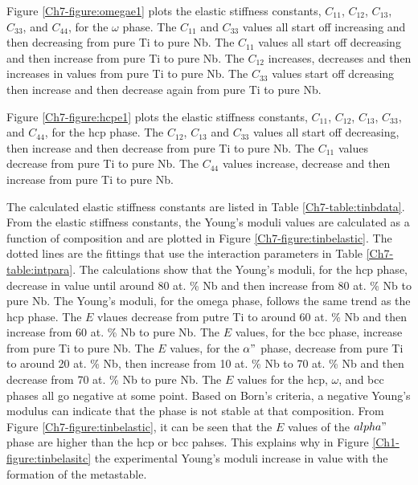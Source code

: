 Figure \ref{Ch7-figure:omegae1} plots the elastic stiffness constants, $C_{11}$, $C_{12}$, $C_{13}$, $C_{33}$, and $C_{44}$, for the $\omega$ phase. The $C_{11}$ and $C_{33}$ values all start off increasing and then decreasing from pure Ti to pure Nb. The $C_{11}$ values all start off decreasing and then increase from pure Ti to pure Nb. The $C_{12}$ increases, decreases and then increases in values from pure Ti to pure Nb. The $C_{33}$ values start off dcreasing then increase and then decrease again from pure Ti to pure Nb. 

Figure \ref{Ch7-figure:hcpe1} plots the elastic stiffness constants, $C_{11}$, $C_{12}$, $C_{13}$, $C_{33}$, and $C_{44}$, for the hcp phase. The $C_{12}$, $C_{13}$ and $C_{33}$ values all start off decreasing, then increase and then decrease from pure Ti to pure Nb. The $C_{11}$ values decrease from pure Ti to pure Nb. The $C_{44}$ values increase, decrease and then increase from pure Ti to pure Nb. 

The calculated elastic stiffness constants are listed in Table \ref{Ch7-table:tinbdata}. From the elastic stiffness constants, the Young's moduli values are calculated as a function of composition and are plotted in Figure \ref{Ch7-figure:tinbelastic}. The dotted lines are the fittings that use the interaction parameters in Table \ref{Ch7-table:intpara}. The calculations show that the Young's moduli, for the hcp phase, decrease in value until around 80 at. \% Nb and then increase from 80 at. \% Nb to pure Nb. The Young's moduli, for the omega phase, follows the same trend as the hcp phase. The $E$ vlaues decrease from putre Ti to around 60 at. \% Nb and then increase from 60 at. \% Nb to pure Nb. The $E$ values, for the bcc phase, increase from pure Ti to pure Nb. The $E$ values, for the $\alpha"$ phase, decrease from pure Ti to around 20 at. \% Nb, then increase from 10 at. \% Nb to 70 at. \% Nb and then decrease from 70 at. \% Nb to pure Nb. The $E$ values for the hcp, $\omega$, and bcc phases all go negative at some point. Based on Born's criteria, a negative Young's modulus can indicate that the phase is not stable at that composition. From Figure \ref{Ch7-figure:tinbelastic}, it can be seen that the $E$ values of the $alpha"$ phase are higher than the hcp or bcc pahses. This explains why in Figure \ref{Ch1-figure:tinbelasitc} the experimental Young's moduli increase in value with the formation of the metastable. 


